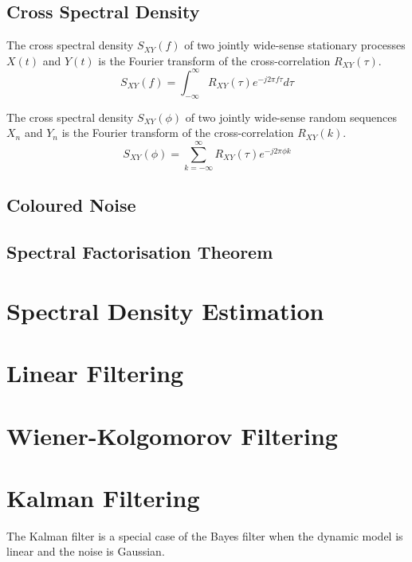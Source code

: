 \documentclass[11pt]{report} %
\begin{document}
\subsection{Cross Spectral Density}

The cross spectral density $S_{XY}\left(f\right)$ of two jointly wide-sense stationary processes $X\left(t\right)$ and $Y\left(t\right)$ is the Fourier transform of the cross-correlation $R_{XY}\left(\tau\right)$.
\begin{equation}
S_{XY}\left(f\right) = \int_{-\infty}^{\infty}R_{XY}\left(\tau\right)e^{-j2\pi f\tau}d\tau
\end{equation}

The cross spectral density $S_{XY}\left(\phi\right)$ of two jointly wide-sense random sequences $X_{n}$ and $Y_{n}$ is the Fourier transform of the cross-correlation $R_{XY}\left(k\right)$.
\begin{equation}
S_{XY}\left(\phi\right) = \sum_{k = -\infty}^{\infty}R_{XY}\left(\tau\right)e^{-j2\pi \phi k}
\end{equation}

\subsection{Coloured Noise}

\subsection{Spectral Factorisation Theorem \cite{Astrom1970}}

\section{Spectral Density Estimation}

\section{Linear Filtering}

\section{Wiener-Kolgomorov Filtering}

\section{Kalman Filtering}

The Kalman filter is a special case of the Bayes filter when the dynamic model is linear and the noise is Gaussian.
\end{document}
